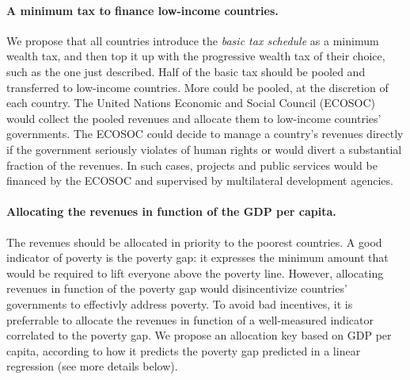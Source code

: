 \documentclass[12pt,english]{article}
\begin{document}
\paragraph{A minimum tax to finance low-income countries.} We propose that all countries introduce the \textit{basic tax schedule} as a minimum wealth tax, and then top it up with the progressive wealth tax of their choice, such as the one just described. 
Half of the basic tax %
should be pooled and transferred to low-income countries. More could be pooled, at the discretion of each country. The United Nations Economic and Social Council (ECOSOC) would collect the pooled revenues and allocate them to low-income countries' governments. The ECOSOC could decide to manage a country's revenues directly if the government seriously violates of human rights or would divert a substantial fraction of the revenues. In such cases, projects and public services would be financed by the ECOSOC and supervised by multilateral development agencies. 

\paragraph{Allocating the revenues in function of the GDP per capita.} The revenues should be allocated in priority to the poorest countries. A good indicator of poverty is the poverty gap: it expresses the minimum amount that would be required to lift everyone above the poverty line. However, allocating revenues in function of the poverty gap would disincentivize countries' governments to effectivly address poverty. To avoid bad incentives, it is preferrable to allocate the revenues in function of a well-measured indicator correlated to the poverty gap. We propose an allocation key based on GDP per capita, according to how it predicts the poverty gap predicted in a linear regression (see more details below). 


\end{document}
